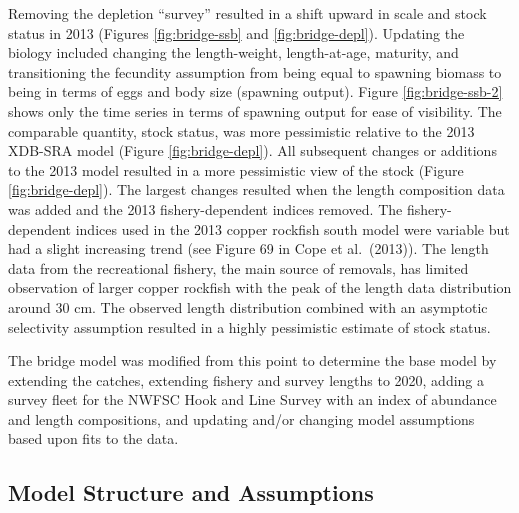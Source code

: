 \documentclass[11pt,
  english,
  a4paper,
]{article}
\begin{document}

Removing the depletion ``survey'' resulted in a shift upward in scale and stock status in 2013 (Figures \ref{fig:bridge-ssb} and \ref{fig:bridge-depl}). Updating the biology included changing the length-weight, length-at-age, maturity, and transitioning the fecundity assumption from being equal to spawning biomass to being in terms of eggs and body size (spawning output). Figure \ref{fig:bridge-ssb-2} shows only the time series in terms of spawning output for ease of visibility. The comparable quantity, stock status, was more pessimistic relative to the 2013 XDB-SRA model (Figure \ref{fig:bridge-depl}). All subsequent changes or additions to the 2013 model resulted in a more pessimistic view of the stock (Figure \ref{fig:bridge-depl}). The largest changes resulted when the length composition data was added and the 2013 fishery-dependent indices removed. The fishery-dependent indices used in the 2013 copper rockfish south model were variable but had a slight increasing trend (see Figure 69 in Cope et al.~{(2013)\leavevmode\tagmcend\tagstructend}). The length data from the recreational fishery, the main source of removals, has limited observation of larger copper rockfish with the peak of the length data distribution around 30 cm. The observed length distribution combined with an asymptotic selectivity assumption resulted in a highly pessimistic estimate of stock status.

\leavevmode\tagmcend\tagstructend\par


The bridge model was modified from this point to determine the base model by extending the catches, extending fishery and survey lengths to 2020, adding a survey fleet for the NWFSC Hook and Line Survey with an index of abundance and length compositions, and updating and/or changing model assumptions based upon fits to the data.

\leavevmode\tagmcend\tagstructend\par


\hypertarget{model-structure-and-assumptions}{%
\subsection{Model Structure and Assumptions}\label{model-structure-and-assumptions}}
\end{document}
